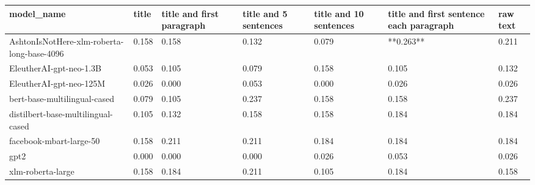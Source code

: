 \begin{tabular}{lllllll}
\toprule
                                model\_name & title & title and first paragraph & title and 5 sentences & title and 10 sentences & title and first sentence each paragraph & raw text \\
\midrule
AshtonIsNotHere-xlm-roberta-long-base-4096 & 0.158 &                     0.158 &                 0.132 &                  0.079 &                               **0.263** &    0.211 \\
                   EleutherAI-gpt-neo-1.3B & 0.053 &                     0.105 &                 0.079 &                  0.158 &                                   0.105 &    0.132 \\
                   EleutherAI-gpt-neo-125M & 0.026 &                     0.000 &                 0.053 &                  0.000 &                                   0.026 &    0.026 \\
              bert-base-multilingual-cased & 0.079 &                     0.105 &                 0.237 &                  0.158 &                                   0.158 &    0.237 \\
        distilbert-base-multilingual-cased & 0.105 &                     0.132 &                 0.158 &                  0.158 &                                   0.184 &    0.184 \\
                   facebook-mbart-large-50 & 0.158 &                     0.211 &                 0.211 &                  0.184 &                                   0.184 &    0.184 \\
                                      gpt2 & 0.000 &                     0.000 &                 0.000 &                  0.026 &                                   0.053 &    0.026 \\
                         xlm-roberta-large & 0.158 &                     0.184 &                 0.211 &                  0.105 &                                   0.184 &    0.158 \\
\bottomrule
\end{tabular}
